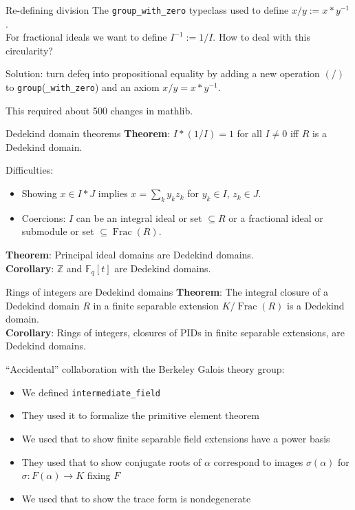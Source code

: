 \documentclass{beamer}
\newcommand{\lean}[1]{\texttt{#1}\xspace}
\newcommand*{\Fq}[1][q]{\mathbb{F}_{#1}}
\newcommand{\mathlib}{\textsf{mathlib}\xspace}
\newcommand{\Z}{\mathbb{Z}}
\DeclareMathOperator{\Frac}{Frac}
\begin{document}
\begin{frame}{Re-defining division}
	The \lean{group\_with\_zero} typeclass used to define $x / y := x * y^{-1}$.\\
	For fractional ideals we want to define $I^{-1} := 1 / I$.
	How to deal with this circularity?

	\pause
	Solution: turn defeq into propositional equality by
	adding a new operation $(/)$ to \lean{group}(\lean{\_with\_zero})
	and an axiom $x / y = x * y^{-1}$.

	This required about 500 changes in \mathlib.
\end{frame}

\begin{frame}{Dedekind domain theorems}
	\textbf{Theorem}: $I * (1 / I) = 1$ for all $I \ne 0$ iff $R$ is a Dedekind domain.

	Difficulties:
	\begin{itemize}
		\item Showing $x \in I * J$ implies $x = \sum_k y_k z_k$ for $y_k \in I$, $z_k \in J$.
		\item Coercions: $I$ can be an integral ideal or set $\subseteq R$ or a fractional ideal or submodule or set $\subseteq \Frac(R)$.
	\end{itemize}

\pause
	\textbf{Theorem}: Principal ideal domains are Dedekind domains.\\
	\textbf{Corollary}: $\Z$ and $\Fq[q][t]$ are Dedekind domains.
\end{frame}

\begin{frame}{Rings of integers are Dedekind domains}
	\textbf{Theorem}: The integral closure of a Dedekind domain $R$ in a finite separable extension $K / \Frac(R)$ is a Dedekind domain.\\
	\textbf{Corollary}: Rings of integers, closures of PIDs in finite separable extensions, are Dedekind domains.

\pause
	``Accidental'' collaboration with the Berkeley Galois theory group:
	\begin{itemize}
		\setlength\itemsep{-0.5\baselineskip}
		\item We defined \lean{intermediate\_field}
		\item They used it to formalize the primitive element theorem
		\item We used that to show finite separable field extensions have a power basis
		\item They used that to show conjugate roots of $\alpha$ correspond to images $\sigma(\alpha)$ for $\sigma : F(\alpha) \to K$ fixing $F$
		\item We used that to show the \alert{trace form} is nondegenerate
	\end{itemize}
\end{frame}
\end{document}
